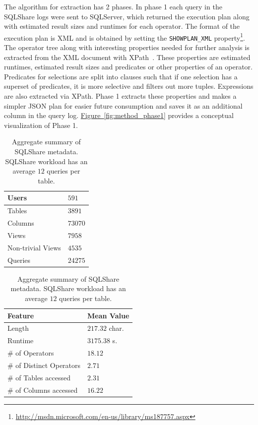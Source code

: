 \documentclass{sig-alternate}
\newcommand{\note}[2]{{\color{#1} {#2}}}
\newcommand{\reviewmeta}[1]{\note{black}{#1}}
\newcommand{\figref}[1]{\hyperref[#1]{Figure~\ref*{#1}}}
\newcommand{\sqlshare}{SQLShare}
\begin{document}
The algorithm for extraction has 2 phases. In phase 1 each query in the \sqlshare{} logs were sent to SQLServer, which returned the execution plan along with estimated result sizes and runtimes for each operator.
The format of the execution plan is XML and is obtained by setting the \texttt{SHOWPLAN\_XML} property\footnote{\url{http://msdn.microsoft.com/en-us/library/ms187757.aspx}}.
The operator tree along with interesting properties needed for further analysis is extracted from the XML document with XPath~\cite{clark1999xml}.
These properties are estimated runtimes, estimated result sizes and predicates or other properties of an operator.
Predicates for selections are split into clauses such that if one selection has a superset of predicates, it is more selective and filters out more tuples.
Expressions are also extracted via XPath.
Phase 1 extracts these properties and makes a simpler JSON plan for easier future consumption and saves it as an additional column in the query log. \figref{fig:method_phase1} provides a conceptual visualization of Phase 1.

\begin{table}[h]
\begin{subtable}{0.45\columnwidth}
\vspace{-10pt}
\centering
\vspace{-10pt}
\begin{tabular}{| p{1.2cm} | l |}
\hline
Users & $591$ \\ \hline
Tables & $3891$  \\ \hline
Columns & $73070$  \\ \hline
Views & $7958$  \\ \hline
Non-trivial Views & $4535$  \\ \hline
Queries & $24275$  \\ \hline
\end{tabular}
\caption{Workload Metadata}
\label{t:summarymetrics1}
\end{subtable}
\vspace{-10pt}
\begin{subtable}{0.45\columnwidth}
\centering
\begin{tabular}{| p{1.8cm} | l |}
\hline
Feature & Mean Value \\ \hline
Length  & $217.32$ char.  \\ \hline
Runtime & $3175.38$ s.  \\ \hline
\# of Operators & $18.12$  \\ \hline
\# of Distinct Operators & $2.71$  \\ \hline
\# of Tables accessed & $2.31$ \\ \hline
\# of Columns accessed & $16.22$ \\ \hline
\end{tabular}
\caption{Query Metadata}
\label{t:summarymetrics2}
\end{subtable}
\caption{Aggregate summary of \sqlshare{} metadata. \reviewmeta{\sqlshare{} workload has an average $12$ queries per table.}}
\end{table}
\end{document}

